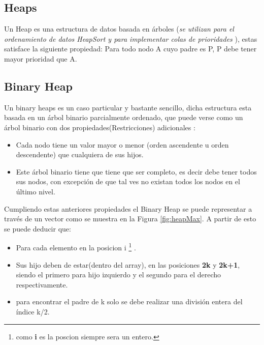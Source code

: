\documentclass[a4paper,10pt]{article}
\begin{document}
\subsection{Heaps}
Un Heap es una estructura de datos basada en árboles (\textit{se utilizan para el ordenamiento de datos \textit{HeapSort} y para implementar colas de prioridades} ), estas satisface la siguiente propiedad: Para todo nodo A cuyo padre es P, P debe tener mayor prioridad que A. 

\subsection{Binary Heap}
Un binary heaps es un caso particular y bastante sencillo, dicha estructura esta basada en un árbol  binario parcialmente ordenado, que puede verse como un árbol binario con dos propiedades(Restricciones) adicionales\cite{AEDc++} :
\begin{itemize}
	\item Cada nodo tiene un valor mayor o menor 		(orden ascendente u orden descendente) que cualquiera de sus hijos.
	\item Este árbol binario tiene que tiene que ser completo, es decir debe tener todos sus nodos, con
excepción de que tal ves no existan todos los nodos en el último nivel.	
\end{itemize}
Cumpliendo estas anteriores propiedades el Binary Heap se puede representar a través de un vector como se muestra en la Figura \ref{fig:heapMax}.
A partir de esto se puede deducir que:
\begin{itemize}
	\item Para cada elemento en la posicion i \footnote{como \textbf{i} es la poscion siempre sera un entero.}  .
	\item Sus hijo deben de estar(dentro del array), en las posiciones \textbf{2k} y \textbf{2k+1}, siendo el primero para hijo izquierdo y el segundo para el derecho respectivamente.
	\item para encontrar el padre de k solo se debe realizar una división entera del índice k/2.
\end{itemize}
\end{document}
